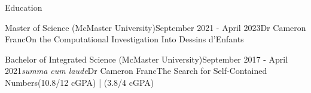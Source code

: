 \begin{rSection}{Education}

\begin{edSubsectionMin}{Master of Science (McMaster University)}{September 2021 - April 2023}{Dr Cameron Franc}{On the Computational Investigation Into Dessins d'Enfants}
\end{edSubsectionMin}



\begin{edSubsectionHonours}{Bachelor of Integrated Science (McMaster University)}{September 2017 - April 2021}{\em summa cum laude}{Dr Cameron Franc}{The Search for Self-Contained Numbers}{(10.8/12 cGPA) | (3.8/4 cGPA)}
\end{edSubsectionHonours}




\end{rSection}